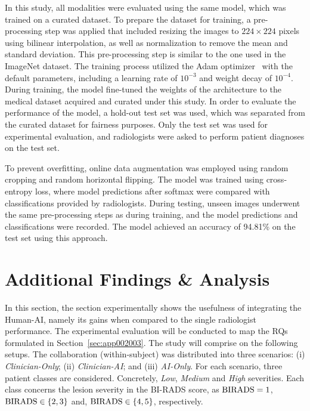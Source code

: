 In this study, all modalities were evaluated using the same model, which was trained on a curated dataset.
To prepare the dataset for training, a pre-processing step was applied that included resizing the images to $224\times 224$ pixels using bilinear interpolation, as well as normalization to remove the mean and standard deviation.
This pre-processing step is similar to the one used in the ImageNet dataset. The training process utilized the Adam optimizer~\cite{kingma2014adam} with the default parameters, including a learning rate of $10^{-3}$ and weight decay of $10^{-4}$.
During training, the model fine-tuned the weights of the architecture to the medical dataset acquired and curated under this study.
In order to evaluate the performance of the model, a hold-out test set was used, which was separated from the curated dataset for fairness purposes.
Only the test set was used for experimental evaluation, and radiologists were asked to perform patient diagnoses on the test set.

To prevent overfitting, online data augmentation was employed using random cropping and random horizontal flipping.
The model was trained using cross-entropy loss, where model predictions after softmax were compared with classifications provided by radiologists.
During testing, unseen images underwent the same pre-processing steps as during training, and the model predictions and classifications were recorded.
The model achieved an accuracy of 94.81\% on the test set using this approach.

\section{Additional Findings \& Analysis}
\label{sec:app002004}

In this section, the section experimentally shows the usefulness of integrating the Human-\ac{AI}, namely its gains when compared to the single radiologist performance.
The experimental evaluation will be conducted to map the \acp{RQ} formulated in Section~\ref{sec:app002003}.
The study will comprise on the following setups.
The collaboration (within-subject) was distributed into three scenarios: (i) {\it Clinician-Only}; (ii) {\it Clinician-AI}; and (iii) {\it AI-Only}.
For each scenario, three patient classes are considered.
Concretely, {\it Low}, {\it Medium} and {\it High} severities.
Each class concerns the lesion severity in the \ac{BI-RADS} score, as ${\rm BIRADS} = 1$, ${\rm BIRADS} \in\{2, 3\}$ and, ${\rm BIRADS}\in\{4, 5\}$, respectively.

